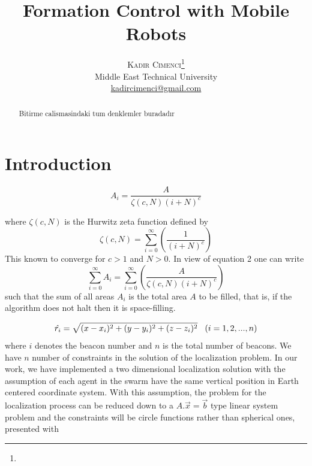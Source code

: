 \documentclass[twoside]{article}
\title{\vspace{-15mm}\fontsize{24pt}{10pt}\selectfont\textbf{Formation Control with Mobile Robots}} %
\author{
	\large
	\textsc{Kadir Cimenci}\thanks{}\\[2mm] %
	\normalsize Middle East Technical University \\ %
	\normalsize \href{mailto:kadircimenci@gmail.com}{kadircimenci@gmail.com} %
	\vspace{-5mm}
}
\date{}
\begin{document}
	
	\maketitle %
	
	\thispagestyle{fancy} %
	
	
	\begin{abstract}
		
	Bitirme calismasindaki tum denklemler buradadır
		
		
	\end{abstract}
	
	
		
		\section{Introduction}
	
	\begin{equation} %
	A_i = {\frac{A}{{\zeta(c,N)(i+N)^c}}}
	\end{equation}	
	
	where ${\zeta(c,N)}$ is the Hurwitz zeta function defined by 
	\begin{equation}
 \zeta(c,N) = \sum_{i=0}^{\infty}\left(\frac{1}{(i+N)^c}\right)
	\end{equation}
	This known to converge for $c>1$ and $N>0$. In view of equation 2 one can write
	\begin{equation}
    \sum_{i=0}^{\infty}A_i = \sum_{i = 0}^{\infty}\left(\frac{A}{\zeta(c,N)(i+N)^c}\right)
	\end{equation}
such that the sum of all areas $A_i$ is the total area $A$ to be filled, that is, if the algorithm does not halt then it is space-filling. 
		



\begin{equation} %
\hat{r_i} = \sqrt{(x-x_i)^2 + (y-y_i)^2+ (z-z_i)^2}    \hspace{0.3cm}   (i=1,2,...,n)
\end{equation}
where $i$ denotes the beacon number and $n$ is the total number of beacons. We have $n$ number of constraints in the solution of the localization problem. In our work, we have implemented a two dimensional localization solution with the assumption of each agent in the swarm have the same vertical position in Earth centered coordinate system. With this assumption, the problem for the localization process can be reduced down to a $A.\vec{x} =\vec{b} $ type linear system problem and the constraints will be circle functions rather than spherical ones, presented with
\end{document}
